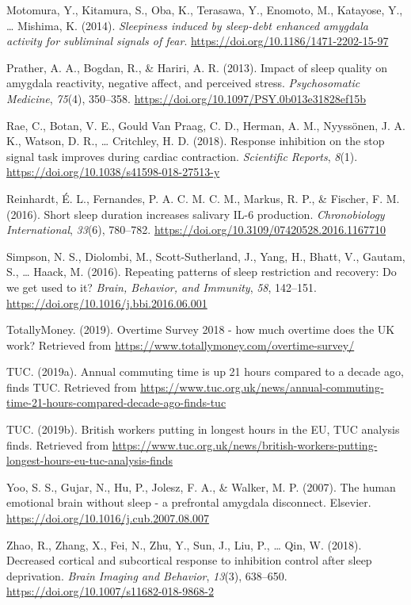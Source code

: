 \documentclass[
  english,
  man]{apa6}
\newlength{\cslhangindent}
\newenvironment{cslreferences}%
  {\setlength{\parindent}{0pt}%
  \everypar{\setlength{\hangindent}{\cslhangindent}}\ignorespaces}%
  {\par}
\begin{document}
\begin{cslreferences}
\leavevmode\hypertarget{ref-Motomura2014}{}%
Motomura, Y., Kitamura, S., Oba, K., Terasawa, Y., Enomoto, M., Katayose, Y., \ldots{} Mishima, K. (2014). \emph{Sleepiness induced by sleep-debt enhanced amygdala activity for subliminal signals of fear}. \url{https://doi.org/10.1186/1471-2202-15-97}

\leavevmode\hypertarget{ref-Prather2013}{}%
Prather, A. A., Bogdan, R., \& Hariri, A. R. (2013). Impact of sleep quality on amygdala reactivity, negative affect, and perceived stress. \emph{Psychosomatic Medicine}, \emph{75}(4), 350--358. \url{https://doi.org/10.1097/PSY.0b013e31828ef15b}

\leavevmode\hypertarget{ref-Rae2018}{}%
Rae, C., Botan, V. E., Gould Van Praag, C. D., Herman, A. M., Nyyssönen, J. A. K., Watson, D. R., \ldots{} Critchley, H. D. (2018). Response inhibition on the stop signal task improves during cardiac contraction. \emph{Scientific Reports}, \emph{8}(1). \url{https://doi.org/10.1038/s41598-018-27513-y}

\leavevmode\hypertarget{ref-Reinhardt2016}{}%
Reinhardt, É. L., Fernandes, P. A. C. M. C. M., Markus, R. P., \& Fischer, F. M. (2016). Short sleep duration increases salivary IL-6 production. \emph{Chronobiology International}, \emph{33}(6), 780--782. \url{https://doi.org/10.3109/07420528.2016.1167710}

\leavevmode\hypertarget{ref-Simpson2016}{}%
Simpson, N. S., Diolombi, M., Scott-Sutherland, J., Yang, H., Bhatt, V., Gautam, S., \ldots{} Haack, M. (2016). Repeating patterns of sleep restriction and recovery: Do we get used to it? \emph{Brain, Behavior, and Immunity}, \emph{58}, 142--151. \url{https://doi.org/10.1016/j.bbi.2016.06.001}

\leavevmode\hypertarget{ref-TotallyMoney}{}%
TotallyMoney. (2019). Overtime Survey 2018 - how much overtime does the UK work? Retrieved from \url{https://www.totallymoney.com/overtime-survey/}

\leavevmode\hypertarget{ref-TUC2}{}%
TUC. (2019a). Annual commuting time is up 21 hours compared to a decade ago, finds TUC. Retrieved from \url{https://www.tuc.org.uk/news/annual-commuting-time-21-hours-compared-decade-ago-finds-tuc}

\leavevmode\hypertarget{ref-TUC1}{}%
TUC. (2019b). British workers putting in longest hours in the EU, TUC analysis finds. Retrieved from \url{https://www.tuc.org.uk/news/british-workers-putting-longest-hours-eu-tuc-analysis-finds}

\leavevmode\hypertarget{ref-Yoo2007a}{}%
Yoo, S. S., Gujar, N., Hu, P., Jolesz, F. A., \& Walker, M. P. (2007). The human emotional brain without sleep - a prefrontal amygdala disconnect. Elsevier. \url{https://doi.org/10.1016/j.cub.2007.08.007}

\leavevmode\hypertarget{ref-Zhao2018}{}%
Zhao, R., Zhang, X., Fei, N., Zhu, Y., Sun, J., Liu, P., \ldots{} Qin, W. (2018). Decreased cortical and subcortical response to inhibition control after sleep deprivation. \emph{Brain Imaging and Behavior}, \emph{13}(3), 638--650. \url{https://doi.org/10.1007/s11682-018-9868-2}
\end{cslreferences}

\endgroup
\end{document}
